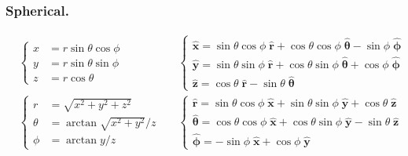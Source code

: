 \documentclass[../../../main.tex]{subfiles}
\begin{document}
\subsubsection{Spherical.}
\begin{align*}
                                            & \begin{cases}
                                                  x & = r \sin \theta \cos \phi \\
                                                  y & = r \sin \theta \sin \phi \\
                                                  z & = r \cos \theta
                                              \end{cases} &   &
    \begin{cases}
        \mathbf{\hat{x}} = \sin \theta \cos \phi \;\mathbf{\hat{r}} + \cos \theta \cos \phi \;\boldsymbol{\hat{\theta}} - \sin \phi \;\boldsymbol{\hat{\phi}} \\
        \mathbf{\hat{y}} = \sin \theta \sin \phi \;\mathbf{\hat{r}} + \cos \theta \sin \phi \;\boldsymbol{\hat{\theta}} + \cos \phi\;\boldsymbol{\hat{\phi}}  \\
        \mathbf{\hat{z}} = \cos \theta\;\mathbf{\hat{r}} - \sin \theta \;\boldsymbol{\hat{\theta}}
    \end{cases} \\
                                            &
    \begin{cases}
        r      & = \sqrt{x^2 + y^2 + z^2}    \\
        \theta & =\arctan \sqrt{x^2 + y^2}/z \\
        \phi   & = \arctan y/z
    \end{cases} &                                  &
    \begin{cases}
        \mathbf{\hat{r}} = \sin \theta \cos \phi \;\mathbf{\hat{x}} + \sin \theta \sin \phi \;\boldsymbol{\hat{y}} + \cos \theta \;\boldsymbol{\hat{z}}         \\
        \boldsymbol{\hat{\theta}} = \cos \theta \cos \phi \;\mathbf{\hat{x}} + \cos \theta \sin \phi \;\boldsymbol{\hat{y}} - \sin \theta\;\boldsymbol{\hat{z}} \\
        \boldsymbol{\hat{\phi}} = -\sin \phi\;\mathbf{\hat{x}} + \cos \phi \;\boldsymbol{\hat{y}}
    \end{cases}
\end{align*}
\end{document}
